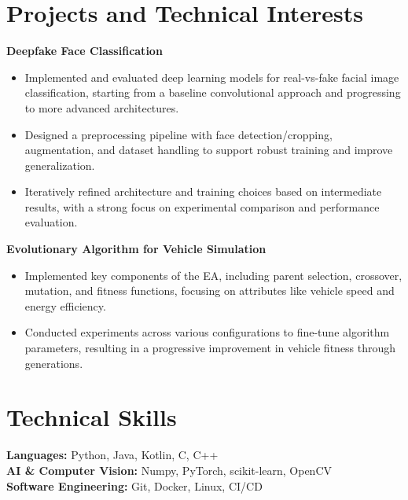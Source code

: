 \documentclass[11pt]{article}
\begin{document}
\vspace{-18.5pt}

\section*{Projects and Technical Interests}

\textbf{Deepfake Face Classification} \\
\vspace{-9pt}
\begin{itemize}
  \item Implemented and evaluated deep learning models for real-vs-fake facial image classification, starting from a baseline convolutional approach and progressing to more advanced architectures.
  \item Designed a preprocessing pipeline with face detection/cropping, augmentation, and dataset handling to support robust training and improve generalization.
  \item Iteratively refined architecture and training choices based on intermediate results, with a strong focus on experimental comparison and performance evaluation.
\end{itemize}

\textbf{Evolutionary Algorithm for Vehicle Simulation} \\
\vspace{-9pt}
\begin{itemize}
  \item Implemented key components of the EA, including parent selection, crossover, mutation, and fitness functions, focusing on attributes like vehicle speed and energy efficiency.
  \item Conducted experiments across various configurations to fine-tune algorithm parameters, resulting in a progressive improvement in vehicle fitness through generations.
\end{itemize}


\vspace{-18.5pt}

\section*{Technical Skills}
\textbf{Languages:} Python, Java, Kotlin, C, C++ \\
\textbf{AI \& Computer Vision:} Numpy, PyTorch, scikit-learn, OpenCV\\
\textbf{Software Engineering:} Git, Docker, Linux, CI/CD
\end{document}
